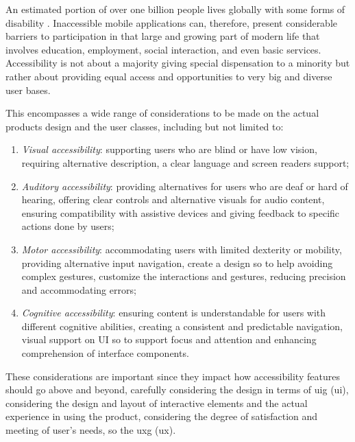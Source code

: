 An estimated portion of over one billion people lives globally with some forms of disability \cite{article:who-disability}. Inaccessible mobile applications can, therefore, present considerable barriers to participation in that large and growing part of modern life that involves education, employment, social interaction, and even basic services. Accessibility is not about a majority giving special dispensation to a minority but rather about providing equal access and opportunities to very big and diverse user bases.

This encompasses a wide range of considerations to be made on the actual products design and the user classes, including but not limited to:
\begin{enumerate}
    \item \textit{Visual accessibility}: supporting users who are blind or have low vision, requiring alternative description, a clear language and screen readers support;

    \item \textit{Auditory accessibility}: providing alternatives for users who are deaf or hard of hearing, offering clear controls and alternative  visuals for audio content, ensuring compatibility with assistive devices and giving feedback to specific actions done by users;

    \item \textit{Motor accessibility}: accommodating users with limited dexterity or mobility, providing alternative input navigation, create a design so to help avoiding complex gestures, customize the interactions and gestures, reducing precision and accommodating errors;

    \item \textit{Cognitive accessibility}: ensuring content is understandable for users with different cognitive abilities, creating a consistent and predictable navigation, visual support on UI so to support focus and attention and enhancing comprehension of interface components.
    
\end{enumerate}

These considerations are important since they impact how accessibility features should go above and beyond, carefully considering the design in terms of \gls{uig} (\acrshort{ui}), considering the design and layout of interactive elements and the actual experience in using the product, considering the degree of satisfaction and meeting of user's needs, so the \gls{uxg} (\acrshort{ux}).  

